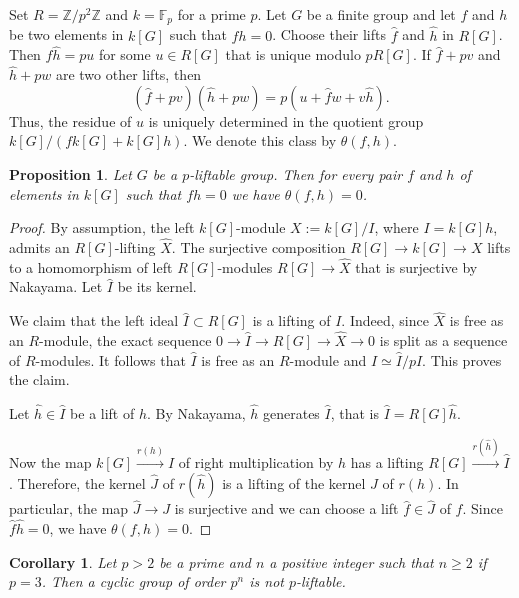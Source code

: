 \documentclass[12pt]{amsart}
\numberwithin{equation}{section}
\newtheorem{proposition}[equation]{Proposition}
\newtheorem{corollary}[equation]{Corollary}
\theoremstyle{definition}
\renewcommand{\(}{\bigl(}
\renewcommand{\)}{\bigr)}
\newcommand{\xra}{\xrightarrow}
\newcommand{\F}{\mathbb{F}}
\newcommand{\Z}{\mathbb{Z}}
\renewcommand{\geq}{\geqslant}
\begin{document}
Set   $R=\Z/p^2\Z$ and $k=\F_p$ for a prime $p$. Let $G$ be a finite group and let
$f$ and $h$ be two elements in $k[G]$ such that $fh=0$. Choose their  lifts
$\hat f$ and $\hat h$ in $R[G]$. Then $\hat f\hat h=pu$ for some $u\in R[G]$
that is unique modulo $pR[G]$. If $\hat f+pv$ and $\hat h+pw$ are two other lifts, then
\[
(\hat f+pv)(\hat h+pw)=p(u+\hat fw+v\hat h).
\]
Thus, the residue of $u$ is uniquely determined in the quotient group $k[G]/(f k[G]+k[G] h)$.
We denote this class by $\theta(f,h)$.



\begin{proposition}\label{more}
Let $G$ be a $p$-liftable group. Then for every pair $f$ and $h$ of elements in $k[G]$ such that $fh=0$
we have $\theta(f,h)=0$.
\end{proposition}

\begin{proof}
By assumption, the left $k[G]$-module $X:=k[G]/I$, where $I=k[G]h$, admits an
$R[G]$-lifting $\widehat X$.
The surjective composition $R[G]\to k[G]\to X$ lifts to a homomorphism of left $R[G]$-modules
$R[G]\to \widehat X$ that is surjective by Nakayama. Let $\widehat I$ be its kernel.

We claim that the left ideal $\widehat I\subset R[G]$ is a lifting of $I$.
Indeed, since $\widehat X$ is free as an $R$-module, the exact sequence
$0\to \widehat I\to R[G]\to \widehat X\to 0$ is split as a sequence of $R$-modules.
It follows that $\widehat I$ is free as an $R$-module and $I\simeq \widehat I/p\widehat I$.
This proves the claim.

Let $\hat h\in \widehat I$
be a lift of $h$. By Nakayama, $\hat h$ generates $\widehat I$, that is  $\widehat I=R[G]\hat h$.

Now the map $k[G]\xra{r(h)} I$ of right multiplication by $h$
has a lifting $R[G]\xra{r(\hat h)} \widehat I$. Therefore, the kernel
$\widehat J$ of $r(\hat h)$ is a lifting of the kernel $J$ of $r(h)$. In particular, the map $\widehat J\to J$
is surjective and we can choose a lift $\hat f\in \widehat J$ of $f$. Since $\hat f\hat h=0$, we have $\theta(f,h)=0$.
\end{proof}

\begin{corollary}\label{cycle}\cite[Proposition 2.8]{KL}
Let $p>2$ be a prime and $n$ a positive integer such that $n\geq 2$ if $p=3$. Then a cyclic group of order $p^n$
is not $p$-liftable.
\end{corollary}
\end{document}
